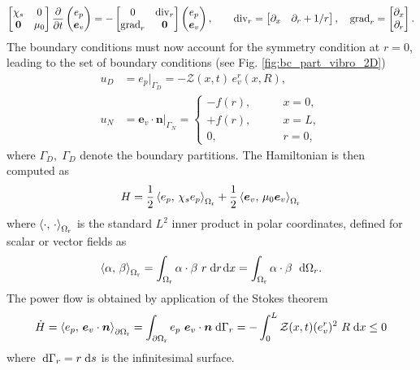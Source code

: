 \begin{equation}
\label{eq:red_mod}
\begin{bmatrix}
\chi_s & 0 \\
\bm{0} & \mu_0  \\
\end{bmatrix}
\diffp{}{t}
\begin{pmatrix}
e_p \\
\bm{e}_v \\
\end{pmatrix} = -
\begin{bmatrix}
0 & \div_r \\
{\grad}_r & \bm{0} \\
\end{bmatrix}
\begin{pmatrix}
e_p \\
\bm{e}_v \\
\end{pmatrix}, \qquad
{\div}_r = \begin{bmatrix}
\partial_x & \partial_r + 1/r
\end{bmatrix}, \quad
{\grad}_r = \begin{bmatrix}
\partial_x\\
\partial_r\\
\end{bmatrix}.
\end{equation}
The boundary conditions must now account for the symmetry condition at $r=0$, leading to the set of boundary conditions (see Fig. \ref{fig:bc_part_vibro_2D})
\begin{align}
u_D &=  e_p|_{\Gamma_D} = - \mathcal{Z}(x, t) \, e_v^r(x, R), \label{eq:bc_imp} \\
u_N &= \bm{e}_v \cdot \bm{n}|_{\Gamma_N} = 
\begin{cases}
- f(r), \qquad &x=0, \\
+ f(r), \qquad &x=L, \\
0, \qquad &r=0,
\end{cases} \label{eq:bc_neu}
\end{align}
where $\Gamma_D, \; \Gamma_D$ denote the boundary partitions.
 The Hamiltonian is then computed as
\[
H = \frac{1}{2} \inner[\Omega_{\text{r}}]{e_p}{\chi_s e_p} + \frac{1}{2} \inner[\Omega_{\text{r}}]{\bm{e}_v}{\mu_0 \bm{e}_v}
\]
where $\inner[\Omega_{\text{r}}]{\cdot}{\cdot}$ is the standard $L^2$ inner product in polar coordinates, defined for scalar or vector fields as
\[
\inner[\Omega_{\text{r}}]{\alpha}{\beta}= \int_{\Omega_{\text{r}}} \alpha \cdot \beta \ r \d{r} \d{x} = \int_{\Omega_{\text{r}}} \alpha \cdot \beta \ \d{\Omega_r}.
\]
The power flow is obtained by application of the Stokes theorem
\[
\dot{H} = \inner[\partial \Omega_{\text{r}}]{e_p}{\bm{e}_v \cdot \bm{n}} = \int_{\partial \Omega_{\text{r}}} e_p \ \bm{e}_v \cdot \bm{n} \d{\Gamma_r} = - \int_{0}^{L} \mathcal{Z}(x, t) (e_v^r)^2 \ R \d{x} \le 0 
\]
where $\d{\Gamma_r} = r \d{s}$ is the infinitesimal surface. \\

